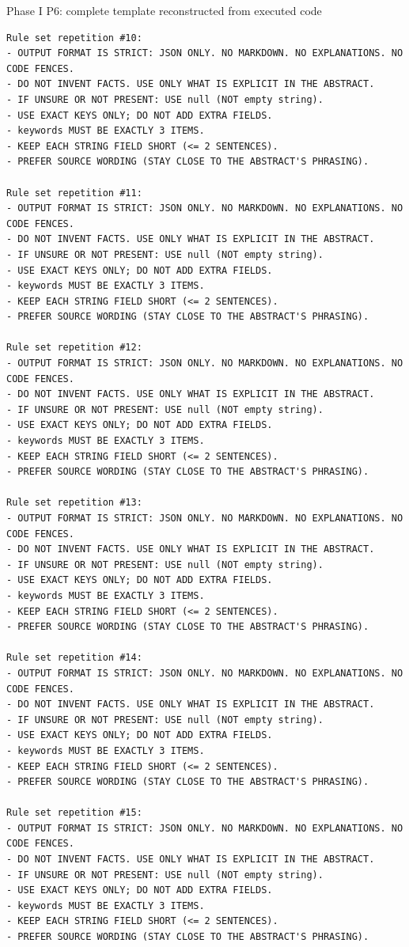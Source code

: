 \documentclass[fleqn,10pt]{wlscirep-authoryear}
\begin{document}
\begin{promptbox}{Phase I P6: complete template reconstructed from executed code}
\begin{lstlisting}[style=promptstyle]
Rule set repetition #10:
- OUTPUT FORMAT IS STRICT: JSON ONLY. NO MARKDOWN. NO EXPLANATIONS. NO CODE FENCES.
- DO NOT INVENT FACTS. USE ONLY WHAT IS EXPLICIT IN THE ABSTRACT.
- IF UNSURE OR NOT PRESENT: USE null (NOT empty string).
- USE EXACT KEYS ONLY; DO NOT ADD EXTRA FIELDS.
- keywords MUST BE EXACTLY 3 ITEMS.
- KEEP EACH STRING FIELD SHORT (<= 2 SENTENCES).
- PREFER SOURCE WORDING (STAY CLOSE TO THE ABSTRACT'S PHRASING).

Rule set repetition #11:
- OUTPUT FORMAT IS STRICT: JSON ONLY. NO MARKDOWN. NO EXPLANATIONS. NO CODE FENCES.
- DO NOT INVENT FACTS. USE ONLY WHAT IS EXPLICIT IN THE ABSTRACT.
- IF UNSURE OR NOT PRESENT: USE null (NOT empty string).
- USE EXACT KEYS ONLY; DO NOT ADD EXTRA FIELDS.
- keywords MUST BE EXACTLY 3 ITEMS.
- KEEP EACH STRING FIELD SHORT (<= 2 SENTENCES).
- PREFER SOURCE WORDING (STAY CLOSE TO THE ABSTRACT'S PHRASING).

Rule set repetition #12:
- OUTPUT FORMAT IS STRICT: JSON ONLY. NO MARKDOWN. NO EXPLANATIONS. NO CODE FENCES.
- DO NOT INVENT FACTS. USE ONLY WHAT IS EXPLICIT IN THE ABSTRACT.
- IF UNSURE OR NOT PRESENT: USE null (NOT empty string).
- USE EXACT KEYS ONLY; DO NOT ADD EXTRA FIELDS.
- keywords MUST BE EXACTLY 3 ITEMS.
- KEEP EACH STRING FIELD SHORT (<= 2 SENTENCES).
- PREFER SOURCE WORDING (STAY CLOSE TO THE ABSTRACT'S PHRASING).

Rule set repetition #13:
- OUTPUT FORMAT IS STRICT: JSON ONLY. NO MARKDOWN. NO EXPLANATIONS. NO CODE FENCES.
- DO NOT INVENT FACTS. USE ONLY WHAT IS EXPLICIT IN THE ABSTRACT.
- IF UNSURE OR NOT PRESENT: USE null (NOT empty string).
- USE EXACT KEYS ONLY; DO NOT ADD EXTRA FIELDS.
- keywords MUST BE EXACTLY 3 ITEMS.
- KEEP EACH STRING FIELD SHORT (<= 2 SENTENCES).
- PREFER SOURCE WORDING (STAY CLOSE TO THE ABSTRACT'S PHRASING).

Rule set repetition #14:
- OUTPUT FORMAT IS STRICT: JSON ONLY. NO MARKDOWN. NO EXPLANATIONS. NO CODE FENCES.
- DO NOT INVENT FACTS. USE ONLY WHAT IS EXPLICIT IN THE ABSTRACT.
- IF UNSURE OR NOT PRESENT: USE null (NOT empty string).
- USE EXACT KEYS ONLY; DO NOT ADD EXTRA FIELDS.
- keywords MUST BE EXACTLY 3 ITEMS.
- KEEP EACH STRING FIELD SHORT (<= 2 SENTENCES).
- PREFER SOURCE WORDING (STAY CLOSE TO THE ABSTRACT'S PHRASING).

Rule set repetition #15:
- OUTPUT FORMAT IS STRICT: JSON ONLY. NO MARKDOWN. NO EXPLANATIONS. NO CODE FENCES.
- DO NOT INVENT FACTS. USE ONLY WHAT IS EXPLICIT IN THE ABSTRACT.
- IF UNSURE OR NOT PRESENT: USE null (NOT empty string).
- USE EXACT KEYS ONLY; DO NOT ADD EXTRA FIELDS.
- keywords MUST BE EXACTLY 3 ITEMS.
- KEEP EACH STRING FIELD SHORT (<= 2 SENTENCES).
- PREFER SOURCE WORDING (STAY CLOSE TO THE ABSTRACT'S PHRASING).


\end{lstlisting}
\end{promptbox}
\end{document}
